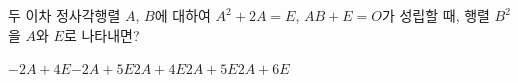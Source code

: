 \hspace*{2mm}\begin{minipage}[t]{\dimexpr\linewidth-2mm\relax}\vspace{0pt}
두 이차 정사각행렬 $A$, $B$에 대하여 $A^2+2A=E$, $AB+E=O$가 성립할 때, 행렬 $B^2$을 $A$와 $E$로 나타내면? 
\begin{choices32}{$-2A+4E$}{$-2A+5E$}{$2A+4E$}{$2A+5E$}{$2A+6E$}\end{choices32}\end{minipage}
